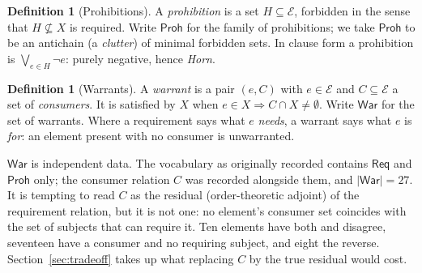 \documentclass[11pt,reqno]{amsart}
\theoremstyle{plain}
\theoremstyle{definition}
\newtheorem{definition}[theorem]{Definition}
\theoremstyle{remark}
\newcommand{\El}{\mathcal{E}}
\newcommand{\Law}{\mathsf{Req}}
\newcommand{\Haz}{\mathsf{Proh}}
\newcommand{\War}{\mathsf{War}}
\begin{document}
\begin{definition}[Prohibitions]
A \emph{prohibition} is a set $H \subseteq \El$, forbidden in the sense that
$H \not\subseteq X$ is required. Write $\Haz$ for the family of prohibitions; we
take $\Haz$ to be an antichain (a \emph{clutter}) of minimal forbidden sets. In
clause form a prohibition is $\bigvee_{e \in H} \neg e$: purely negative, hence
\emph{Horn}.
\end{definition}

\begin{definition}[Warrants]
A \emph{warrant} is a pair $(e, C)$ with $e \in \El$ and $C \subseteq \El$ a set
of \emph{consumers}. It is satisfied by $X$ when
$e \in X \Rightarrow C \cap X \neq \emptyset$. Write $\War$ for the set of
warrants. Where a requirement says what $e$ \emph{needs}, a warrant says what $e$
is \emph{for}: an element present with no consumer is unwarranted.
\end{definition}

$\War$ is independent data. The vocabulary as originally recorded contains
$\Law$ and $\Haz$ only; the consumer relation $C$ was recorded alongside them,
and $|\War| = 27$. It is tempting to read $C$ as the residual (order-theoretic
adjoint) of the requirement relation, but it is not one: no element's consumer
set coincides with the set of subjects that can require it. Ten elements have
both and disagree, seventeen have a consumer and no requiring subject, and eight
the reverse. Section~\ref{sec:tradeoff} takes up what replacing $C$ by the true
residual would cost.
\end{document}
